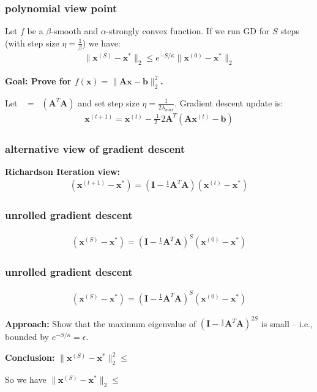 \documentclass[compress]{beamer}
\newcommand{\bv}[1]{\mathbf{#1}}
\DeclareMathOperator*{\lmax}{\lambda_{max}}
\begin{document}
\begin{frame}[t]
	\frametitle{polynomial view point}
	\begin{theorem}
		Let $f$ be a $\beta$-smooth and $\alpha$-strongly convex function. If we run GD for $S$ steps (with step size $\eta = \frac{1}{\beta}$) we have:
		\begin{align*}
			\|\bv{x}^{(S)} - \bv{x}^*\|_2 \leq e^{-S/\kappa} \|\bv{x}^{(0)} - \bv{x}^*\|_2
		\end{align*} 
	\end{theorem}
	
	\begin{center}
		\alert{\textbf{Goal: Prove for $f(\bv{x}) = \|\bv{A}\bv{x} - \bv{b}\|_2^2$.}}
	\end{center}	
	Let $\lmax = \lmax(\bv{A}^T\bv{A})$ and set step size $\eta = \frac{1}{2\lambda_{max}}$. Gradient descent update is:
	\begin{align*}
		\bv{x}^{(t+1)} = \bv{x}^{(t)} - \frac{1}{2\lmax}2\bv{A}^T(\bv{A}\bv{x}^{(t)} - \bv{b})
	\end{align*}
	
\end{frame}

\begin{frame}[t]
	\frametitle{alternative view of gradient descent}
	\textbf{Richardson Iteration view:}
	\begin{align*}
		(\bv{x}^{(t+1)} - \bv{x}^*) =  \left(\bv{I} - \frac{1}{\lmax}\bv{A}^T\bv{A}\right)(\bv{x}^{(t)} - \bv{x}^*) 
	\end{align*}
	


\end{frame}

\begin{frame}[t]
	\frametitle{unrolled gradient descent}
	\begin{align*}
		(\bv{x}^{(S)} - \bv{x}^*) =  \left(\bv{I} - \frac{1}{\lmax}\bv{A}^T\bv{A}\right)^S(\bv{x}^{(0)} - \bv{x}^*) 
	\end{align*}
	

\end{frame}

\begin{frame}[t]
	\frametitle{unrolled gradient descent}
	\begin{align*}
		(\bv{x}^{(S)} - \bv{x}^*) =  \left(\bv{I} - \frac{1}{\lmax}\bv{A}^T\bv{A}\right)^S(\bv{x}^{(0)} - \bv{x}^*) 
	\end{align*}
	
	\textbf{Approach:} Show that the maximum eigenvalue of $\left(\bv{I} - \frac{1}{\lmax}\bv{A}^{T}\bv{A}\right)^{2S}$ is small -- i.e., bounded by $e^{-S/\kappa} = \epsilon$. 
	
	\textbf{Conclusion:}
	 $\|\bv{x}^{(S)} - \bv{x}^*\|_2^2 \leq $
	
	So we have $\|\bv{x}^{(S)} - \bv{x}^*\|_2 \leq $
\end{frame}
\end{document}
